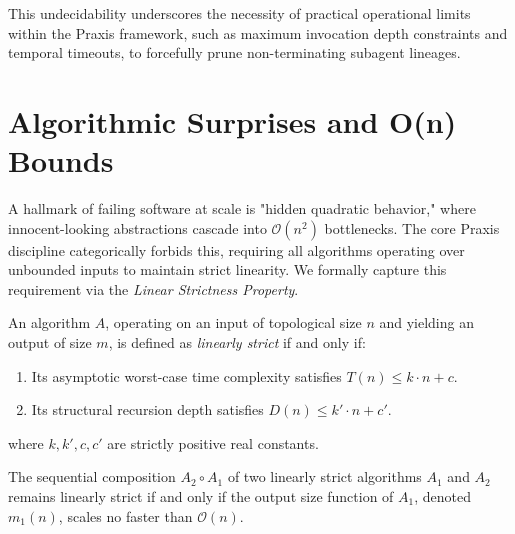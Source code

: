 This undecidability underscores the necessity of practical operational limits within the Praxis framework, such as maximum invocation depth constraints and temporal timeouts, to forcefully prune non-terminating subagent lineages.

\section{Algorithmic Surprises and O(n) Bounds}

A hallmark of failing software at scale is "hidden quadratic behavior," where innocent-looking abstractions cascade into $\mathcal{O}(n^2)$ bottlenecks. The core Praxis discipline categorically forbids this, requiring all algorithms operating over unbounded inputs to maintain strict linearity. We formally capture this requirement via the \textit{Linear Strictness Property}.

\begin{definition}
An algorithm $A$, operating on an input of topological size $n$ and yielding an output of size $m$, is defined as \textit{linearly strict} if and only if:
\begin{enumerate}
    \item Its asymptotic worst-case time complexity satisfies $T(n) \le k \cdot n + c$.
    \item Its structural recursion depth satisfies $D(n) \le k' \cdot n + c'$.
\end{enumerate}
where $k, k', c, c'$ are strictly positive real constants.
\end{definition}

\begin{lemma}
\label{lem:linear_composition}
The sequential composition $A_2 \circ A_1$ of two linearly strict algorithms $A_1$ and $A_2$ remains linearly strict if and only if the output size function of $A_1$, denoted $m_1(n)$, scales no faster than $\mathcal{O}(n)$.
\end{lemma}


